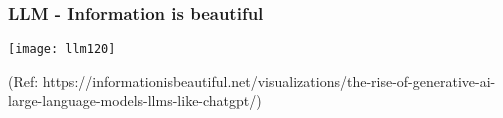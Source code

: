 \begin{frame}[fragile]\frametitle{LLM - Information is beautiful}


\begin{center}
\texttt{[image: llm120]}
\end{center}		

{\tiny (Ref: https://informationisbeautiful.net/visualizations/the-rise-of-generative-ai-large-language-models-llms-like-chatgpt/)}

\end{frame}





				


  
    
